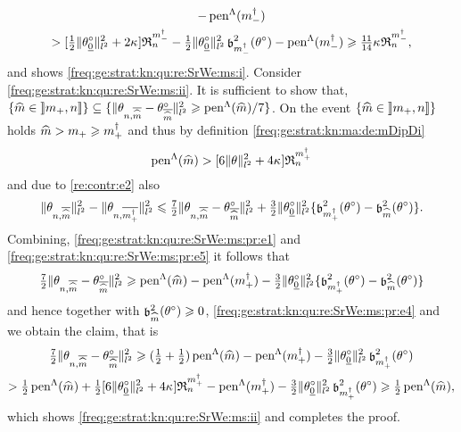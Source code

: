 \begin{pro}
\begin{multline*}
    -\penSv[\mdDi]\\
    >[\tfrac{1}{2}\Vnormlp{\xdf_{\underline{0}}}^2+2\cpen]\daRaS{\mdDi}{\xdf,\Lambda}
    -\tfrac{1}{2}\Vnormlp{\xdf_{\underline{0}}}^2\bias[\mdDi]^2(\xdf)-\penSv[\mdDi]
    \geq\tfrac{11}{14}\cpen\daRaS{\mdDi}{\xdf,\Lambda},
  \end{multline*}
  and shows \ref{freq:ge:strat:kn:qu:re:SrWe:ms:i}.  Consider \ref{freq:ge:strat:kn:qu:re:SrWe:ms:ii}. It is sufficient to show that,
  $\{\hDi\in\nsetlo{\pDi,\ssY}\}\subseteq
  \{\Vnormlp{\txdfPr[\hDi]-\xdfPr[\hDi]}^2\geq\penSv[\hDi]/7\}$.  On the
  event $\{\hDi\in\nsetlo{\pDi,\ssY}\}$ holds $\hDi>\pDi\geq\pdDi$ and
  thus by definition \eqref{freq:ge:strat:kn:ma:de:mDipDi}
  \begin{equation}\label{freq:ge:strat:kn:qu:re:SrWe:ms:pr:e4}
    \penSv[\hDi] > [6\Vnormlp{\So}^2+ 4\cpen] \daRaS{\pdDi}{\xdf,\Lambda}
  \end{equation}
  and due to  \ref{re:contr:e2} also
  \begin{equation}\label{freq:ge:strat:kn:qu:re:SrWe:ms:pr:e5}
    \Vnormlp{\txdfPr[\hDi]}^2-\Vnormlp{\txdfPr[\pdDi]}^2\leq
    \tfrac{7}{2}\Vnormlp{\txdfPr[\hDi]-\xdfPr[\hDi]}^2+\tfrac{3}{2}\Vnormlp{\xdf_{\underline{0}}}^2
    \{\bias[\pdDi]^2(\xdf)-\bias[\hDi]^2(\xdf)\}.
  \end{equation}
  Combining, \eqref{freq:ge:strat:kn:qu:re:SrWe:ms:pr:e1} and \eqref{freq:ge:strat:kn:qu:re:SrWe:ms:pr:e5} it
  follows that
  \begin{multline*}
    \tfrac{7}{2}\Vnormlp{\txdfPr[\hDi]-\xdfPr[\hDi]}^2\geq
    \penSv[\hDi]-\penSv[\pdDi]  -\tfrac{3}{2}\Vnormlp{\xdf_{\underline{0}}}^2
    \{\bias[\pdDi]^2(\xdf)-\bias[\hDi]^2(\xdf)\}\hfill
  \end{multline*}
  and hence together with $\bias[\hDi]^2(\xdf)\geq0$,
  \eqref{freq:ge:strat:kn:qu:re:SrWe:ms:pr:e4} and  we obtain the claim,
  that is
  \begin{multline*}
    \tfrac{7}{2}\Vnormlp{\txdfPr[\hDi]-\xdfPr[\hDi]}^2\geq
    (\tfrac{1}{2}+\tfrac{1}{2})\penSv[\hDi]-\penSv[\pdDi]  -\tfrac{3}{2}\Vnormlp{\xdf_{\underline{0}}}^2
    \bias[\pdDi]^2(\xdf)\\
    >\tfrac{1}{2}\penSv[\hDi]+\tfrac{1}{2}[6\Vnormlp{\xdf_{\underline{0}}}^2+ 4\cpen]
    \daRaS{\pdDi}{\xdf,\Lambda}-\penSv[\pdDi]-\tfrac{3}{2}\Vnormlp{\xdf_{\underline{0}}}^2
    \bias[\pdDi]^2(\xdf)
    \geq\tfrac{1}{2}\penSv[\hDi],
  \end{multline*}
  which shows \ref{freq:ge:strat:kn:qu:re:SrWe:ms:ii} and completes the proof.\proEnd
\end{pro}

